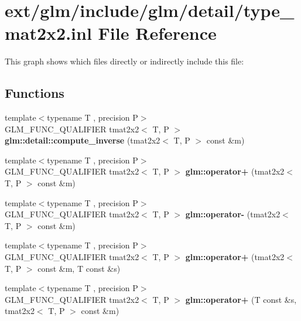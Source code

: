 \hypertarget{type__mat2x2_8inl}{\section{ext/glm/include/glm/detail/type\-\_\-mat2x2.inl File Reference}
\label{type__mat2x2_8inl}
}
This graph shows which files directly or indirectly include this file\-:
\subsection*{Functions}
\begin{DoxyCompactItemize}
\item 
\hypertarget{namespaceglm_1_1detail_a214532e9ff939e1ceeffb00ceb387e9d}{{\footnotesize template$<$typename T , precision P$>$ }\\G\-L\-M\-\_\-\-F\-U\-N\-C\-\_\-\-Q\-U\-A\-L\-I\-F\-I\-E\-R tmat2x2$<$ T, P $>$ {\bfseries glm\-::detail\-::compute\-\_\-inverse} (tmat2x2$<$ T, P $>$ const \&m)}\label{namespaceglm_1_1detail_a214532e9ff939e1ceeffb00ceb387e9d}

\item 
\hypertarget{namespaceglm_aff6e5187326e145111072dd76297dc30}{{\footnotesize template$<$typename T , precision P$>$ }\\G\-L\-M\-\_\-\-F\-U\-N\-C\-\_\-\-Q\-U\-A\-L\-I\-F\-I\-E\-R tmat2x2$<$ T, P $>$ {\bfseries glm\-::operator+} (tmat2x2$<$ T, P $>$ const \&m)}\label{namespaceglm_aff6e5187326e145111072dd76297dc30}

\item 
\hypertarget{namespaceglm_a5c577105c34c751e1be42b9406ef239d}{{\footnotesize template$<$typename T , precision P$>$ }\\G\-L\-M\-\_\-\-F\-U\-N\-C\-\_\-\-Q\-U\-A\-L\-I\-F\-I\-E\-R tmat2x2$<$ T, P $>$ {\bfseries glm\-::operator-\/} (tmat2x2$<$ T, P $>$ const \&m)}\label{namespaceglm_a5c577105c34c751e1be42b9406ef239d}

\item 
\hypertarget{namespaceglm_af95592c53ae62512b260ff07e16731ee}{{\footnotesize template$<$typename T , precision P$>$ }\\G\-L\-M\-\_\-\-F\-U\-N\-C\-\_\-\-Q\-U\-A\-L\-I\-F\-I\-E\-R tmat2x2$<$ T, P $>$ {\bfseries glm\-::operator+} (tmat2x2$<$ T, P $>$ const \&m, T const \&s)}\label{namespaceglm_af95592c53ae62512b260ff07e16731ee}

\item 
\hypertarget{namespaceglm_aa70e85814d7889ed2c79dc4353068771}{{\footnotesize template$<$typename T , precision P$>$ }\\G\-L\-M\-\_\-\-F\-U\-N\-C\-\_\-\-Q\-U\-A\-L\-I\-F\-I\-E\-R tmat2x2$<$ T, P $>$ {\bfseries glm\-::operator+} (T const \&s, tmat2x2$<$ T, P $>$ const \&m)}\label{namespaceglm_aa70e85814d7889ed2c79dc4353068771}


\end{DoxyCompactItemize}
